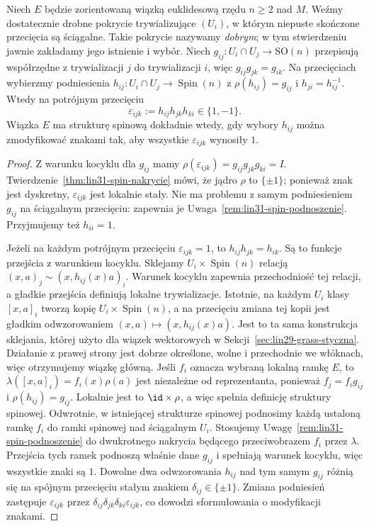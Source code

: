 \begin{stwierdzenie}
\label{prop:lin31-w2-znaki}
Niech $E$ będzie zorientowaną wiązką euklidesową
rzędu $n\geq2$ nad $M$. Weźmy dostatecznie drobne
pokrycie trywializujące $(U_i)$, w którym
niepuste skończone przecięcia są ściągalne. Takie pokrycie
nazywamy \emph{dobrym}; w tym stwierdzeniu jawnie zakładamy jego istnienie i wybór.
Niech $g_{ij}:U_i\cap U_j\to\mathrm{SO}(n)$
przepisują współrzędne z trywializacji $j$ do trywializacji $i$,
więc $g_{ij}g_{jk}=g_{ik}$.
Na przecięciach wybierzmy podniesienia
$h_{ij}:U_i\cap U_j\to\operatorname{Spin}(n)$
z $\rho(h_{ij})=g_{ij}$ i $h_{ji}=h_{ij}^{-1}$.
Wtedy na potrójnym przecięciu
\begin{equation}\label{eq:lin31-w2-znaki}
 \varepsilon_{ijk}:=h_{ij}h_{jk}h_{ki}
          \in\{1,-1\}.
\end{equation}
Wiązka $E$ ma strukturę spinową dokładnie wtedy,
gdy wybory $h_{ij}$ można zmodyfikować znakami
tak, aby wszystkie $\varepsilon_{ijk}$ wynosiły $1$.
\end{stwierdzenie}
\begin{proof}
Z warunku kocyklu dla $g_{ij}$ mamy
$\rho(\varepsilon_{ijk})
=g_{ij}g_{jk}g_{ki}=I$.
Twierdzenie~\ref{thm:lin31-spin-nakrycie} mówi, że
jądro $\rho$ to $\{\pm1\}$; ponieważ znak jest
dyskretny, $\varepsilon_{ijk}$ jest lokalnie stały.
Nie ma problemu z samym podniesieniem
$g_{ij}$ na ściągalnym przecięciu:
zapewnia je Uwaga~\ref{rem:lin31-spin-podnoszenie}.
Przyjmujemy też $h_{ii}=1$.

Jeżeli na każdym potrójnym przecięciu
$\varepsilon_{ijk}=1$, to
$h_{ij}h_{jk}=h_{ik}$.
Są to funkcje przejścia z warunkiem kocyklu.
Sklejamy $U_i\times\operatorname{Spin}(n)$ relacją
$(x,a)_j\sim(x,h_{ij}(x)a)_i$. Warunek kocyklu zapewnia
przechodniość tej relacji, a gładkie przejścia definiują lokalne
trywializacje. Istotnie, na każdym $U_i$ klasy
$[x,a]_i$ tworzą kopię $U_i\times\operatorname{Spin}(n)$,
a na przecięciu zmiana tej kopii jest gładkim
odwzorowaniem $(x,a)\mapsto(x,h_{ij}(x)a)$.
Jest to ta sama konstrukcja sklejania, której
użyto dla wiązek wektorowych
w Sekcji~\ref{sec:lin29-grass-styczna}.
Działanie z prawej strony jest dobrze określone, wolne
i przechodnie we włóknach, więc otrzymujemy wiązkę główną.
Jeśli $f_i$ oznacza wybraną lokalną ramkę $E$, to
$\lambda([x,a]_i)=f_i(x)\rho(a)$ jest niezależne od reprezentanta,
ponieważ $f_j=f_i g_{ij}$ i $\rho(h_{ij})=g_{ij}$.
Lokalnie jest to $\id\times\rho$, a więc spełnia definicję
struktury spinowej.
Odwrotnie, w istniejącej strukturze spinowej podnosimy każdą
ustaloną ramkę $f_i$ do ramki spinowej nad ściągalnym $U_i$.
Stosujemy Uwagę~\ref{rem:lin31-spin-podnoszenie} do dwukrotnego
nakrycia będącego przeciwobrazem $f_i$ przez $\lambda$.
Przejścia tych ramek podnoszą właśnie dane $g_{ij}$ i spełniają
warunek kocyklu, więc wszystkie znaki są $1$.
Dowolne dwa odwzorowania $h_{ij}$ nad
tym samym $g_{ij}$ różnią się na spójnym
przecięciu stałym znakiem
$\delta_{ij}\in\{\pm1\}$.
Zmiana podniesień zastępuje
$\varepsilon_{ijk}$ przez
$\delta_{ij}\delta_{jk}\delta_{ki}
\varepsilon_{ijk}$, co dowodzi
sformułowania o modyfikacji znakami.
\end{proof}


